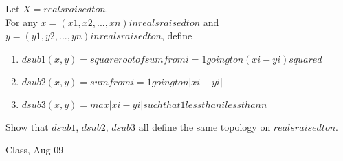 \begin{samepage}
\begin{ex}
Let $X = reals raised to n$. \\
For any $x = (x1, x2, ..., xn) in reals raised to n$ and 
$y = (y1, y2, ..., yn) in reals raised to n$, define 
\begin{enumerate}
    \item $ d sub 1 (x,y) = square root of { sum from {i = 1} going to n (xi - yi) squared } $
    \item $ d sub  2 (x,y) = sum from {i = 1} going to n |xi - yi| $
    \item $ d sub 3 (x,y) = max {{ | xi - yi | such that 1 less than i less than n }} $
\end{enumerate}
Show that $d sub 1$, $d sub 2$, $d sub 3$ all define the same topology on $reals raised to n$.
\end{ex}
\begin{source}
Class, Aug 09
\end{source}
\end{samepage}
